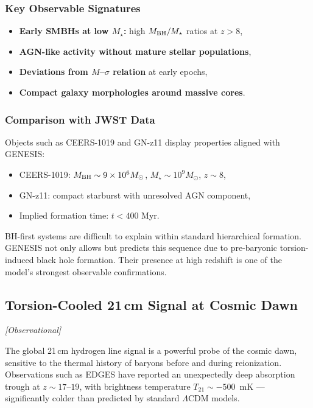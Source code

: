 \documentclass{article}
\newcommand{\obstag}{\textcolor{green!60!black}{\textit{[Observational]}}}
\begin{document}
\subsubsection*{Key Observable Signatures}
\begin{itemize}
  \item \textbf{Early SMBHs at low $M_\star$:} high $M_{\rm BH}/M_\star$ ratios at $z > 8$,
  \item \textbf{AGN-like activity without mature stellar populations},
  \item \textbf{Deviations from $M$–$\sigma$ relation} at early epochs,
  \item \textbf{Compact galaxy morphologies around massive cores}.
\end{itemize}

\subsubsection*{Comparison with JWST Data}
Objects such as CEERS-1019 and GN-z11 display properties aligned with GENESIS:
\begin{itemize}
  \item CEERS-1019: $M_{\rm BH} \sim 9 \times 10^6 M_\odot$, $M_\star \sim 10^9 M_\odot$, $z \sim 8$,
  \item GN-z11: compact starburst with unresolved AGN component,
  \item Implied formation time: $t < 400$ Myr.
\end{itemize}

\begin{tcolorbox}[colback=gray!5, colframe=black!30, title=Why this matters]
BH-first systems are difficult to explain within standard hierarchical formation. GENESIS not only allows but predicts this sequence due to pre-baryonic torsion-induced black hole formation. Their presence at high redshift is one of the model’s strongest observable confirmations.
\end{tcolorbox}


\subsection{ Torsion-Cooled 21\,cm Signal at Cosmic Dawn}
\label{sec:21cm_torsion}
\obstag


The global 21\,cm hydrogen line signal is a powerful probe of the cosmic dawn, sensitive to the thermal history of baryons before and during reionization. Observations such as EDGES have reported an unexpectedly deep absorption trough at $z \sim 17$--$19$, with brightness temperature $T_{21} \sim -500$~mK — significantly colder than predicted by standard $\Lambda$CDM models.
\end{document}
